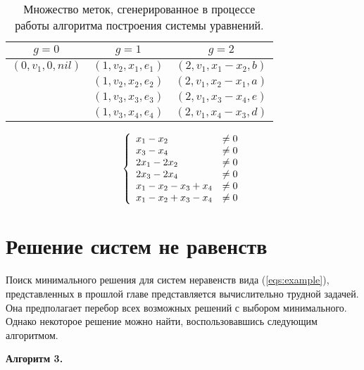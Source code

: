 \documentclass[14pt]{mmcs-article}
\begin{document}
\begin{table}[H]
    \centering
    \begin{tabular}{ | c | c | c | }
        \hline
        $g = 0$            & $g = 1$               & $g = 2$                   \\ \hline
        $(0, v_1, 0, nil)$ & $(1, v_2,  x_1, e_1)$ & $(2, v_1,  x_1 - x_2, b)$ \\ \hline
                           & $(1, v_2,  x_2, e_2)$ & $(2, v_1,  x_2 - x_1, a)$ \\ \hline
                           & $(1, v_3,  x_3, e_3)$ & $(2, v_1,  x_3 - x_4, e)$ \\ \hline
                           & $(1, v_3,  x_4, e_4)$ & $(2, v_1,  x_4 - x_3, d)$ \\ \hline
    \end{tabular}
    \caption{ Множество меток, сгенерированное в процессе работы алгоритма построения системы уравнений. }
    \label{cycle_search_table_neq}
\end{table}

\begin{equation}
    \centering
    \left\{
        \begin{array}{ll}
            x_1 - x_2 &\neq 0\\
            x_3 - x_4 &\neq 0\\
            2 x_1 - 2 x_2 &\neq 0\\
            2 x_3 - 2 x_4 &\neq 0\\
            x_1 - x_2 - x_3 + x_4 &\neq 0\\
            x_1 - x_2 + x_3 - x_4 &\neq 0\\
        \end{array}
    \right.
    \label{eqs:cycle_search_neqs}
\end{equation}

\section{Решение систем не равенств}

Поиск минимального решения для систем неравенств вида (\ref{eqs:example}), представленных в прошлой главе представляется вычислительно трудной задачей. Она предполагает перебор всех возможных решений с выбором минимального. Однако некоторое решение можно найти, воспользовавшись следующим алгоритмом.

\textbf{Алгоритм 3.}
\end{document}

